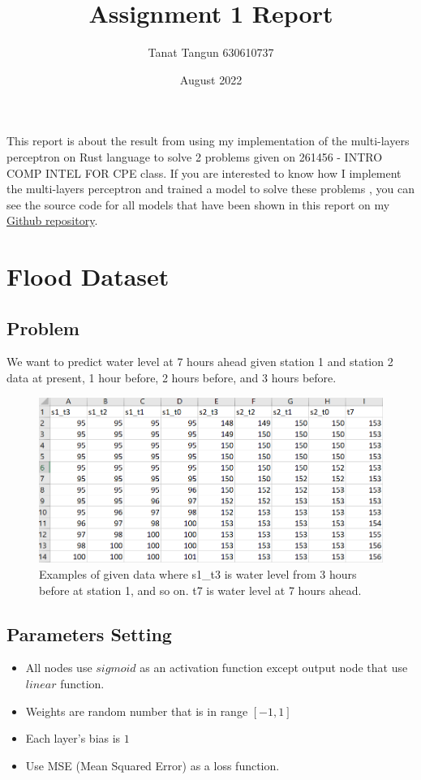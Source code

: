 \documentclass{article}
\title{Assignment 1 Report}
\author{Tanat Tangun 630610737}
\date{August 2022}
\begin{document}
\maketitle

This report is about the result from using my implementation of the multi-layers perceptron
on Rust language to solve 2 problems given on 261456 - INTRO COMP INTEL FOR CPE class. 
If you are interested to know how I implement the multi-layers perceptron and trained a model to solve these problems
, you can see the source code for all models that have been shown in this report on my 
\href{https://github.com/RiwEZ/MLPOnRust}{Github repository}.

\section{Flood Dataset}
\subsection*{Problem}
We want to predict water level at 7 hours ahead given station 1 and station 2 
data at present, 1 hour before, 2 hours before, and 3 hours before. 
\begin{figure}[ht]
	\includegraphics[width=\textwidth]{flood_data}
	\caption{Examples of given data
		where s1\_t3 is water level from 3 hours before at station 1, and so on.
		t7 is water level at 7 hours ahead.}
	\label{fig:1}
\end{figure}

\subsection*{Parameters Setting}
\begin{itemize}
	\item All nodes use $sigmoid$ as an activation function except output node that use $linear$ function.
	\item Weights are random number that is in range $[-1, 1]$
	\item Each layer's bias is $1$
	\item Use MSE (Mean Squared Error) as a loss function.
\end{itemize}
\end{document}
